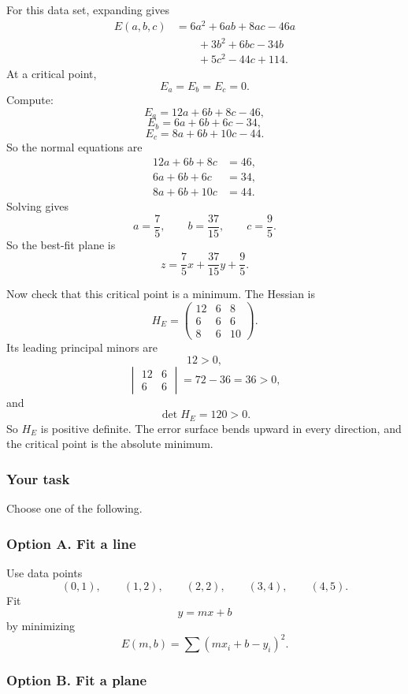 For this data set, expanding gives
\[
\begin{aligned}
E(a,b,c)
&=
6a^2+6ab+8ac-46a\\
&\qquad
+3b^2+6bc-34b\\
&\qquad
+5c^2-44c+114.
\end{aligned}
\]
At a critical point,
\[
    E_a=E_b=E_c=0.
\]
Compute:
\[
    E_a=12a+6b+8c-46,
\]
\[
    E_b=6a+6b+6c-34,
\]
\[
    E_c=8a+6b+10c-44.
\]
So the normal equations are
\[
\boxed{
\begin{aligned}
12a+6b+8c&=46,\\
6a+6b+6c&=34,\\
8a+6b+10c&=44.
\end{aligned}
}
\]
Solving gives
\[
\boxed{
    a=\frac75,\qquad b=\frac{37}{15},\qquad c=\frac95.
}
\]
So the best-fit plane is
\[
\boxed{
    z=\frac75x+\frac{37}{15}y+\frac95.
}
\]

Now check that this critical point is a minimum.  The Hessian is
\[
    H_E=
    \begin{pmatrix}
    12&6&8\\
    6&6&6\\
    8&6&10
    \end{pmatrix}.
\]
Its leading principal minors are
\[
    12>0,
\]
\[
    \begin{vmatrix}
    12&6\\
    6&6
    \end{vmatrix}
    =
    72-36=36>0,
\]
and
\[
    \det H_E=120>0.
\]
So \(H_E\) is positive definite.  The error surface bends upward in every direction, and
the critical point is the absolute minimum.

\subsubsection*{Your task}

Choose one of the following.

\subsubsection*{Option A. Fit a line}

Use data points
\[
    (0,1),\qquad (1,2),\qquad (2,2),\qquad (3,4),\qquad (4,5).
\]
Fit
\[
    y=mx+b
\]
by minimizing
\[
    E(m,b)=\sum (mx_i+b-y_i)^2.
\]

\subsubsection*{Option B. Fit a plane}

